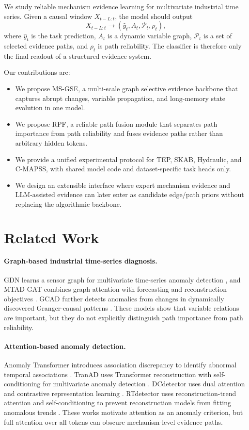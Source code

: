 \documentclass[letterpaper]{article}
\begin{document}
We study reliable mechanism evidence learning for multivariate industrial time series. Given a causal window \(X_{t-L:t}\), the model should output
\[
X_{t-L:t} \rightarrow (\hat y_t, A_t, \mathcal{P}_t, \rho_t),
\]
where \(\hat y_t\) is the task prediction, \(A_t\) is a dynamic variable graph, \(\mathcal{P}_t\) is a set of selected evidence paths, and \(\rho_t\) is path reliability. The classifier is therefore only the final readout of a structured evidence system.

Our contributions are:
\begin{itemize}
    \item We propose MS-GSE, a multi-scale graph selective evidence backbone that captures abrupt changes, variable propagation, and long-memory state evolution in one model.
    \item We propose RPF, a reliable path fusion module that separates path importance from path reliability and fuses evidence paths rather than arbitrary hidden tokens.
    \item We provide a unified experimental protocol for TEP, SKAB, Hydraulic, and C-MAPSS, with shared model code and dataset-specific task heads only.
    \item We design an extensible interface where expert mechanism evidence and LLM-assisted evidence can later enter as candidate edge/path priors without replacing the algorithmic backbone.
\end{itemize}

\section{Related Work}

\paragraph{Graph-based industrial time-series diagnosis.}
GDN learns a sensor graph for multivariate time-series anomaly detection \citep{deng2021gdn}, and MTAD-GAT combines graph attention with forecasting and reconstruction objectives \citep{zhao2020mtadgat}. GCAD further detects anomalies from changes in dynamically discovered Granger-causal patterns \citep{liu2025gcad}. These models show that variable relations are important, but they do not explicitly distinguish path importance from path reliability.

\paragraph{Attention-based anomaly detection.}
Anomaly Transformer introduces association discrepancy to identify abnormal temporal associations \citep{xu2022anomalytransformer}. TranAD uses Transformer reconstruction with self-conditioning for multivariate anomaly detection \citep{tuli2022tranad}. DCdetector uses dual attention and contrastive representation learning \citep{yang2023dcdetector}. RTdetector uses reconstruction-trend attention and self-conditioning to prevent reconstruction models from fitting anomalous trends \citep{liu2025rtdetector}. These works motivate attention as an anomaly criterion, but full attention over all tokens can obscure mechanism-level evidence paths.
\end{document}
